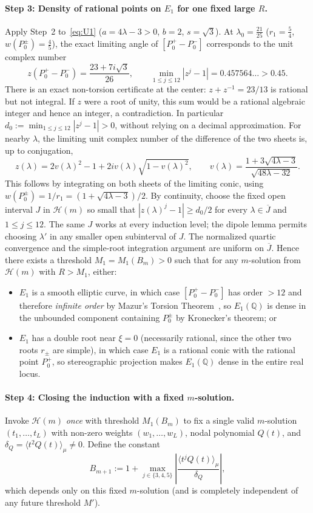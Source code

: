 \documentclass[11pt,a4paper]{article}
\theoremstyle{definition}
\theoremstyle{remark}
\newcommand{\QQ}{\mathbb{Q}}
\begin{document}
\paragraph{Step 3: Density of rational points on $E_1$ for one fixed large $R$.}
Apply Step~2 to~\eqref{eq:U1} ($a = 4\lambda - 3 > 0$, $b = 2$, $s = \sqrt{3}$). At $\lambda_0 = \frac{21}{25}$ ($r_1 = \frac{5}{4}$, $w(P_0^\pm) = \frac{4}{5}$), the exact limiting angle of $[P_0^+ - P_0^-]$ corresponds to the unit complex number
\[
z(P_0^+ - P_0^-) = \frac{23 + 7 i \sqrt{3}}{26}, \qquad \min_{1 \le j \le 12} |z^j - 1| = 0.457564\dots > 0.45.
\]
There is an exact non-torsion certificate at the center: $z+z^{-1}=23/13$ is rational but not integral. If $z$ were a root of unity, this sum would be a rational algebraic integer and hence an integer, a contradiction. In particular $d_0:=\min_{1\le j\le12}|z^j-1|>0$, without relying on a decimal approximation. For nearby $\lambda$, the limiting unit complex number of the difference of the two sheets is, up to conjugation,
\[
z(\lambda)=2v(\lambda)^2-1+2i v(\lambda)\sqrt{1-v(\lambda)^2},\qquad
v(\lambda)=\frac{1+3\sqrt{4\lambda-3}}{\sqrt{48\lambda-32}}.
\]
This follows by integrating on both sheets of the limiting conic, using $w(P_0^\pm)=1/r_1=(1+\sqrt{4\lambda-3})/2$. By continuity, choose the fixed open interval $J$ in $\mathcal H(m)$ so small that $|z(\lambda)^j-1|\ge d_0/2$ for every $\lambda\in\overline J$ and $1\le j\le12$. The same $J$ works at every induction level; the dipole lemma permits choosing $\lambda'$ in any smaller open subinterval of $J$. The normalized quartic convergence and the simple-root integration argument are uniform on $\overline J$. Hence there exists a threshold $M_1 = M_1(B_m) > 0$ such that for any $m$-solution from $\mathcal{H}(m)$ with $R > M_1$, either:
\begin{itemize}
\item $E_1$ is a smooth elliptic curve, in which case $[P_0^+ - P_0^-]$ has order $> 12$ and therefore \emph{infinite order} by Mazur's Torsion Theorem~\cite{Mazur1977}, so $E_1(\QQ)$ is dense in the unbounded component containing $P_0^\pm$ by Kronecker's theorem; or
\item $E_1$ has a double root near $\xi = 0$ (necessarily rational, since the other two roots $r_\pm$ are simple), in which case $E_1$ is a rational conic with the rational point $P_0^+$, so stereographic projection makes $E_1(\QQ)$ dense in the entire real locus.
\end{itemize}

\paragraph{Step 4: Closing the induction with a fixed $m$-solution.}
Invoke $\mathcal{H}(m)$ \emph{once} with threshold $M_1(B_m)$ to fix a single valid $m$-solution $(t_1, \dots, t_L)$ with non-zero weights $(w_1, \dots, w_L)$, nodal polynomial $Q(t)$, and $\delta_Q = \langle t^2 Q(t) \rangle_\mu \neq 0$. Define the constant
\[
B_{m+1} := 1 + \max_{j \in \{3, 4, 5\}} \left|\frac{\langle t^j Q(t) \rangle_\mu}{\delta_Q}\right|,
\]
which depends only on this fixed $m$-solution (and is completely independent of any future threshold $M'$).
\end{document}
